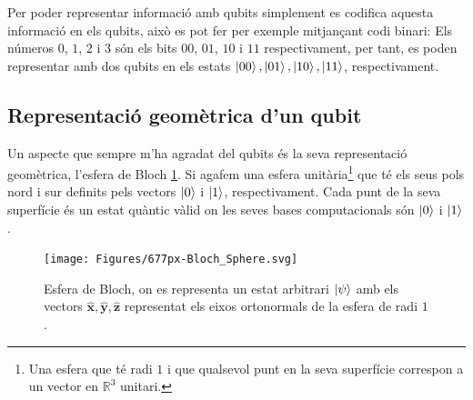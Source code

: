 Per poder representar informació amb qubits simplement es codifica aquesta informació en els qubits, això es pot fer per exemple mitjançant codi binari: Els números $0$, $1$, $2$ i $3$ són els bits $00$, $01$, $10$ i $11$ respectivament, per tant, es poden representar amb dos qubits en els estats $\ket{00}, \ket{01}, \ket{10}, \ket{11}$, respectivament.

\subsection{Representació geomètrica d'un qubit}
Un aspecte que sempre m'ha agradat del qubits és la seva representació geomètrica, l'esfera de Bloch \ref{fig:677px-blochsphere}. Si agafem una esfera unitària\footnote{Una esfera que té radi $1$ i que qualsevol punt en la seva superfície correspon a un vector en $\mathbb{R}^3$ unitari. } que té els seus pols nord i sur definits pels vectors $\ket{0}$ i $\ket{1}$, respectivament. Cada punt de la seva superfície és un estat quàntic vàlid on les seves bases computacionals són $\ket{0}$ i $\ket{1}$.
\begin{figure}
	\centering
	\texttt{[image: Figures/677px-Bloch\_Sphere.svg]}
	\caption{Esfera de Bloch, on es representa un estat arbitrari $\ket{\psi}$ amb els vectors $\hat{\mathbf{x}}, \hat{\mathbf{y}}, \hat{\mathbf{z}}$ representat els eixos ortonormals de la esfera de radi $1$.}
	\label{fig:677px-blochsphere}
\end{figure}

